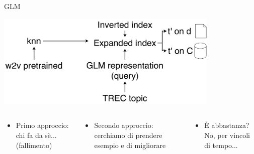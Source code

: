 \begin{frame}{GLM}
    \begin{center}
        \includegraphics[width=0.8\textwidth]{img/reproduction.pdf}
    \end{center}
    \begin{columns}
        \begin{column}{0.33\textwidth}
            \begin{itemize}
                \item Primo approccio: chi fa da sè... (fallimento)
            \end{itemize}
        \end{column}
        \begin{column}{0.33\textwidth}
            \begin{itemize}
                \item Secondo approccio: cerchiamo di prendere esempio e di migliorare
            \end{itemize}
        \end{column}
        \begin{column}{0.33\textwidth}
            \begin{itemize}
                \item È abbastanza? No, per vincoli di tempo...
            \end{itemize}
        \end{column}
    \end{columns}
\end{frame}

